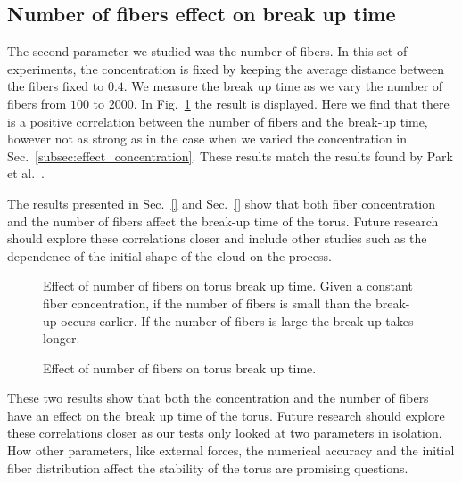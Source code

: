 \subsection{Number of fibers effect on break up time}
\label{subsec:effect_number}

The second parameter we studied was the number of fibers. In this set of experiments, the concentration is fixed by keeping the average distance between the fibers fixed to $0.4$. We measure the break up time as we vary the number of fibers from $100$ to $2000$. In Fig.~\ref{fig:number_breakup} the result is displayed. Here we find that there is a positive correlation between the number of fibers and the break-up time, however not as strong as in the case when we varied the concentration in Sec.~\ref{subsec:effect_concentration}. These results match the results found by Park et al.~\cite{Park2010}.

The results presented in Sec.~\ref{} and Sec.~\ref{} show that both fiber concentration and the number of fibers affect the break-up time of the torus. Future research should explore these correlations closer and include other studies such as the dependence of the initial shape of the cloud on the process.

\begin{figure}[!htbp]
  \centering
  \caption[Effect of number of fibers on torus break up time.]{Effect of number of fibers on torus break up time. Given a constant fiber concentration, if the number of fibers is small than the break-up occurs earlier. If the number of fibers is large the break-up takes longer.}
  \caption{Effect of number of fibers on torus break up time.}
  \label{fig:number_breakup}
\end{figure}

These two results show that both the concentration and the number of fibers have an effect on the break up time of the torus. Future research should explore these correlations closer as our tests only looked at two parameters in isolation. How other parameters, like external forces, the numerical accuracy and the initial fiber distribution affect the stability of the torus are promising questions.

